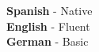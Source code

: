 

\begin{cventries}

    \begin{flushleft}
        \textnormal{{\bfseries Spanish} - Native \\}
        \textnormal{{\bfseries English} - Fluent \\}
        \textnormal{{\bfseries German} - Basic}
    \end{flushleft}

\end{cventries}
